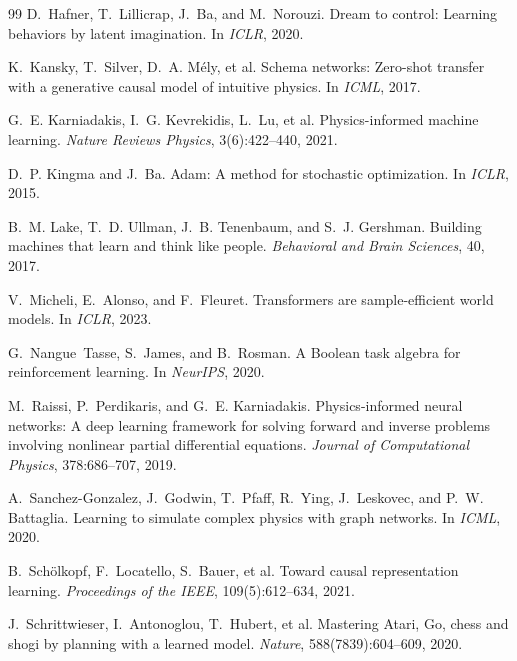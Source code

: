 \documentclass[twoside,11pt]{article}
\begin{document}
\begin{thebibliography}{99}
D.~Hafner, T.~Lillicrap, J.~Ba, and M.~Norouzi.
\newblock Dream to control: Learning behaviors by latent imagination.
\newblock In \emph{ICLR}, 2020.

K.~Kansky, T.~Silver, D.~A. M\'{e}ly, et al.
\newblock Schema networks: Zero-shot transfer with a generative causal model of intuitive physics.
\newblock In \emph{ICML}, 2017.

G.~E. Karniadakis, I.~G. Kevrekidis, L.~Lu, et al.
\newblock Physics-informed machine learning.
\newblock \emph{Nature Reviews Physics}, 3(6):422--440, 2021.

D.~P. Kingma and J.~Ba.
\newblock Adam: A method for stochastic optimization.
\newblock In \emph{ICLR}, 2015.

B.~M. Lake, T.~D. Ullman, J.~B. Tenenbaum, and S.~J. Gershman.
\newblock Building machines that learn and think like people.
\newblock \emph{Behavioral and Brain Sciences}, 40, 2017.

V.~Micheli, E.~Alonso, and F.~Fleuret.
\newblock Transformers are sample-efficient world models.
\newblock In \emph{ICLR}, 2023.

G.~Nangue~Tasse, S.~James, and B.~Rosman.
\newblock A Boolean task algebra for reinforcement learning.
\newblock In \emph{NeurIPS}, 2020.

M.~Raissi, P.~Perdikaris, and G.~E. Karniadakis.
\newblock Physics-informed neural networks: A deep learning framework for solving forward and inverse problems involving nonlinear partial differential equations.
\newblock \emph{Journal of Computational Physics}, 378:686--707, 2019.

A.~Sanchez-Gonzalez, J.~Godwin, T.~Pfaff, R.~Ying, J.~Leskovec, and P.~W. Battaglia.
\newblock Learning to simulate complex physics with graph networks.
\newblock In \emph{ICML}, 2020.

B.~Sch\"{o}lkopf, F.~Locatello, S.~Bauer, et al.
\newblock Toward causal representation learning.
\newblock \emph{Proceedings of the IEEE}, 109(5):612--634, 2021.

J.~Schrittwieser, I.~Antonoglou, T.~Hubert, et al.
\newblock Mastering Atari, Go, chess and shogi by planning with a learned model.
\newblock \emph{Nature}, 588(7839):604--609, 2020.


\end{thebibliography}
\end{document}

